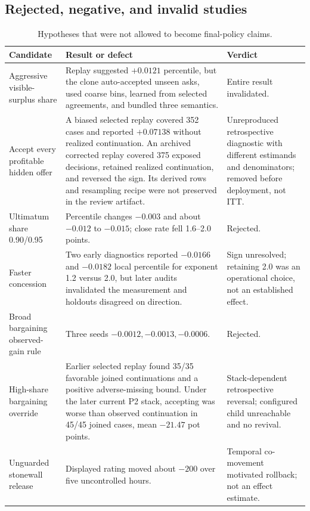 \subsection{Rejected, negative, and invalid studies}

\begin{table}[h]
\centering
\small
\caption{Hypotheses that were not allowed to become final-policy claims.}
\label{tab:negative}
\begin{tabularx}{\linewidth}{@{}p{3.0cm}p{4.9cm}Y@{}}
\toprule
Candidate & Result or defect & Verdict \\
\midrule
Aggressive visible-surplus share & Replay suggested $+0.0121$ percentile, but the clone auto-accepted unseen asks, used coarse bins, learned from selected agreements, and bundled three semantics. & Entire result invalidated. \\
Accept every profitable hidden offer & A biased selected replay covered 352 cases and reported $+0.07138$ without realized continuation. An archived corrected replay covered 375 exposed decisions, retained realized continuation, and reversed the sign. Its derived rows and resampling recipe were not preserved in the review artifact. & Unreproduced retrospective diagnostic with different estimands and denominators; removed before deployment, not ITT. \\
Ultimatum share 0.90/0.95 & Percentile changes $-0.003$ and about $-0.012$ to $-0.015$; close rate fell 1.6--2.0 points. & Rejected. \\
Faster concession & Two early diagnostics reported $-0.0166$ and $-0.0182$ local percentile for exponent 1.2 versus 2.0, but later audits invalidated the measurement and holdouts disagreed on direction. & Sign unresolved; retaining 2.0 was an operational choice, not an established effect. \\
Broad bargaining observed-gain rule & Three seeds $-0.0012,-0.0013,-0.0006$. & Rejected. \\
High-share bargaining override & Earlier selected replay found 35/35 favorable joined continuations and a positive adverse-missing bound. Under the later current P2 stack, accepting was worse than observed continuation in 45/45 joined cases, mean $-21.47$ pot points. & Stack-dependent retrospective reversal; configured child unreachable and no revival. \\
Unguarded stonewall release & Displayed rating moved about $-200$ over five uncontrolled hours. & Temporal co-movement motivated rollback; not an effect estimate. \\

\end{tabularx}
\end{table}
